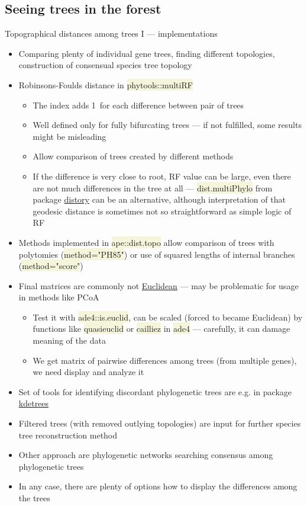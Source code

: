 \documentclass[compress, xelatex, 11pt, xcolor=svgnames, aspectratio=169,
	hyperref={
		bookmarks=true,
		unicode=true,
		colorlinks=true,
		pdftitle={Molecular data in R},
		plainpages=false,
		pdfauthor={Vojtech Zeisek},
		pdfsubject={Course about phylogeny and evolution in R},
		pdfcreator={XeLaTeX},
		pdfkeywords={R, evolution, phylogeny, molecular data},
		linkcolor=Crimson, %
		anchorcolor=Magenta, %
		citecolor=Magenta, %
		filecolor=Magenta, %
		menucolor=Magenta, %
		urlcolor=DodgerBlue, %
		},
	url={hyphens, lowtilde} %
	]{beamer}
\renewcommand{\texttt}[1]{\colorbox{Beige}{{\ttfamily #1}}}
\begin{document}
\subsection{Seeing trees in the forest}

\begin{frame}[allowframebreaks]{Topographical distances among trees I --- implementations}
	\begin{itemize}
		\item Comparing plenty of individual gene trees, finding different topologies, construction of consensual species tree topology
		\item Robinsons-Foulds distance in \texttt{phytools::multiRF}
		\begin{itemize}
			\item The index adds 1~for each difference between pair of trees
			\item Well defined only for fully bifurcating trees --- if not fulfilled, some results might be misleading
			\item Allow comparison of trees created by different methods
			\item If the difference is very close to root, RF value can be large, even there are not much differences in the tree at all --- \texttt{dist.multiPhylo} from package \href{https://CRAN.R-project.org/package=distory}{distory} can be an alternative, although interpretation of that geodesic distance is sometimes not so straightforward as simple logic of RF
		\end{itemize}
		\item Methods implemented in \texttt{ape::dist.topo} allow comparison of trees with polytomies (\texttt{method="PH85"}) or use of squared lengths of internal branches (\texttt{method="score"})
		\item Final matrices are commonly not \href{https://en.wikipedia.org/wiki/Euclidean_distance_matrix}{Euclidean} --- may be problematic for usage in methods like PCoA
		\begin{itemize}
			\item Test it with \texttt{ade4::is.euclid}, can be scaled (forced to became Euclidean) by functions like \texttt{quasieuclid} or \texttt{cailliez} in \texttt{ade4} --- carefully, it can damage meaning of the data
			\item We get matrix of pairwise differences among trees (from multiple genes), we need display and analyze it
		\end{itemize}
		\item Set of tools for identifying discordant phylogenetic trees are e.g. in package \href{https://github.com/V-Z/kdetrees}{kdetrees}
		\item Filtered trees (with removed outlying topologies) are input for further species tree reconstruction method
		\item Other approach are phylogenetic networks searching consensus among phylogenetic trees
		\item In any case, there are plenty of options how to display the differences among the trees
	\end{itemize}
\end{frame}
\end{document}
